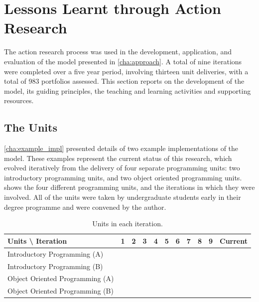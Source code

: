
\clearpage
\section{Lessons Learnt through Action Research} %
\label{sec:lessons_learnt_from_action_research}

The action research process was used in the development, application, and evaluation of the model presented in \cref{cha:approach}. A total of nine iterations were completed over a five year period, involving thirteen unit deliveries, with a total of 983 portfolios assessed. This section reports on the development of the model, its guiding principles, the teaching and learning activities and supporting resources.

\subsection{The Units} %
\label{sub:the_units}

\cref{cha:example_impl} presented details of two example implementations of the model. These examples represent the current status of this research, which evolved iteratively from the delivery of four separate programming units: two introductory programming units, and two object oriented programming units.  shows the four different programming units, and the iterations in which they were involved. All of the units were taken by undergraduate students early in their degree programme and were convened by the author. 

\begin{table}[htb]
  \footnotesize
  \renewcommand{\arraystretch}{1.3}
  \caption{Units in each iteration.}
  \label{tbl:units_iteration}
  \centering
	\begin{tabular}{l|c|c|c|c|c|c|c|c|c|c}
		Units \textbackslash{} Iteration & 1 & 2 & 3 & 4 & 5 & 6 & 7 & 8 & 9 & Current \\ \hline
		Introductory Programming (A) & \checkmark & ~ & \checkmark & ~           & \checkmark & \checkmark & ~           & \checkmark & ~ & \checkmark           \\ 
		Introductory Programming (B)    & ~           & ~           & ~           & ~           & ~           & ~           & \checkmark & \checkmark & \checkmark & \checkmark \\ \hline
		Object Oriented Programming (A) & ~           & \checkmark & ~           & \checkmark & ~           & ~           & \checkmark & ~           & \checkmark & \checkmark \\ 
		Object Oriented Programming (B) & ~           & ~           & ~           & ~           & ~           & ~           & ~           & ~           & \checkmark & \checkmark
	\end{tabular}
\end{table}

